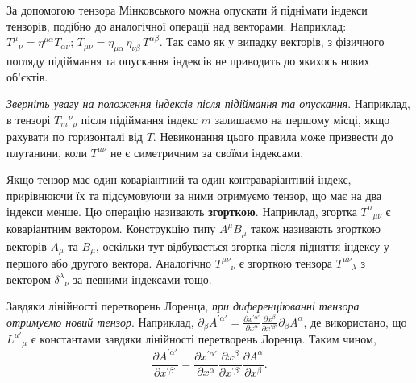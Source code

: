 За допомогою тензора Мінковського можна опускати й піднімати індекси тензорів, подібно до аналогічної операції над
векторами. Наприклад: $T^\mu{}_\nu = \eta^{\mu\alpha} T_{\alpha\nu}$; $T_{\mu\nu} = \eta_{\mu\alpha}\, \eta_{\nu\beta}\,
T^{\alpha\beta}$. Так само як у випадку векторів, з фізичного погляду підіймання та опускання індексів не приводить до
якихось нових об'єктів.

\textit{Зверніть увагу на положення індексів після підіймання та опускання}. Наприклад, в тензорі $T_m{}^\nu{}_\rho$
  після підіймання індекс $m$ залишаємо на першому місці, якщо рахувати по горизонталі від $T$. Невиконання цього
  правила може призвести до плутанини, коли $T^{\mu\nu}$ не є симетричним за своїми індексами.

Якщо тензор має один коваріантний та один контраваріантний індекс, прирівнюючи їх та підсумовуючи за ними отримуємо
тензор, що має на два індекси менше. Цю операцію називають \textbf{згорткою}. Наприклад, згортка $T^\mu{}_{\mu\nu}$ є
коваріантним вектором. Конструкцію типу $A^\mu B_\mu$ також називають згорткою векторів $A_\mu$ та $B_\mu$, оскільки тут
відбувається згортка після підняття індексу у першого або другого вектора. Аналогічно $T^{\mu\nu}{}_\nu$ є згорткою
тензора $T^{\mu\nu}{}_\lambda$ з вектором $\delta^\lambda{}_\nu$ за певними індексами тощо.

Завдяки лінійності перетворень Лоренца, \emph{при диференціюванні тензора отримуємо новий тензор}. Наприклад,
  $\partial_\beta A^{\prime\alpha'} = \frac{\partial x^{\prime\alpha'}}{\partial x^\alpha} \frac{\partial
  x^\beta}{\partial x^{\prime\beta'}} \partial_\beta A^\alpha$, де використано, що $L^{\mu'}{}_\mu$ є константами
  завдяки лінійності перетворень Лоренца. Таким чином,
\begin{equation*}
  \frac{\partial A^{\prime\alpha'}}{\partial x^{\prime\beta'}} =
  \frac{\partial x^{\prime\alpha'}}{\partial x^\alpha}
  \frac{\partial x^\beta}{\partial x^{\prime\beta'}}
  \frac{\partial A^\alpha}{\partial x^\beta}.
\end{equation*}

